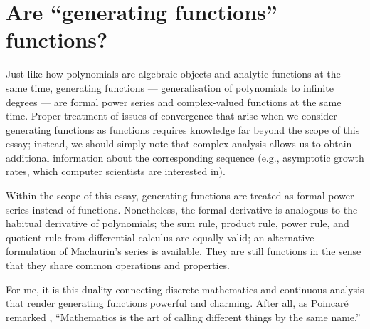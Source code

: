 \documentclass[a4paper, 12pt]{report}
\begin{document}
\section{Are ``generating functions'' functions?}
Just like how polynomials are algebraic objects and analytic functions at the same time, generating functions --- generalisation of polynomials to infinite degrees --- are formal power series and complex-valued functions at the same time. Proper treatment of issues of convergence that arise when we consider generating functions as functions requires knowledge far beyond the scope of this essay; instead, we should simply note that complex analysis allows us to obtain additional information about the corresponding sequence (e.g., asymptotic growth rates, which computer scientists are interested in). 

Within the scope of this essay, generating functions are treated as formal power series instead of functions. Nonetheless, the formal derivative is analogous to the habitual derivative of polynomials; the sum rule, product rule, power rule, and quotient rule from differential calculus are equally valid; an alternative formulation of Maclaurin's series is available. They are still functions in the sense that they share common operations and properties.

For me, it is this duality connecting discrete mathematics and continuous analysis that render generating functions powerful and charming. After all, as Poincaré remarked \autocite[1]{zorich}, ``Mathematics is the art of calling different things by the same name.''

{\let\clearpage\relax
\printbibliography[keyword={consulted}, title={Further Reading}]
\nocite{*}
\printbibliography[keyword={cited}, title={Works Cited}]
}

\thispagestyle{empty}
\end{document}

